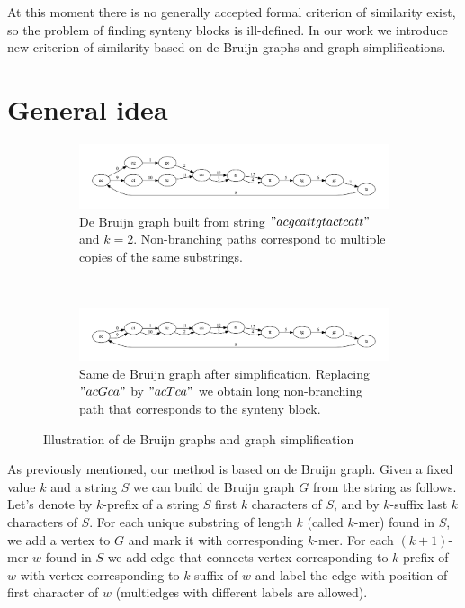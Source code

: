 \documentclass[a4paper,12pt]{scrartcl}
\begin{document}
At this moment there is no generally accepted formal criterion of similarity exist, so the problem of finding synteny blocks is ill-defined.
In our work we introduce new criterion of similarity based on de Bruijn graphs and graph simplifications.

\section{General idea}

\begin{figure}
        \begin{subfigure}[a]{1\textwidth}
		\includegraphics[scale = 0.50]{graph1.pdf}
		\small \caption{De Bruijn graph built from string \("acgcattgtactcatt"\) and \(k = 2\). Non-branching paths correspond to multiple
			copies of the same substrings.}
		\label{DeBruijnA}
        \end{subfigure}
	\\
        \begin{subfigure}[b]{1\textwidth}
		\includegraphics[scale = 0.50]{graph2.pdf}
		\small \caption{Same de Bruijn graph after simplification. Replacing \("acGca"\) by \("acTca"\) we obtain long non-branching path
			that corresponds to the synteny block.}
		\label{DeBruijnB}
        \end{subfigure}
	\small \caption{Illustration of de Bruijn graphs and graph simplification}
\end{figure}

As previously mentioned, our method is based on de Bruijn graph.
Given a fixed value \(k\) and a string \(S\) we can build de Bruijn graph \(G\) from the string as follows.
Let's denote by \(k\)-prefix of a string \(S\) first \(k\) characters of \(S\), and by \(k\)-suffix last \(k\) characters of \(S\).
For each unique substring of length \(k\) (called \(k\)-mer) found in \(S\), we add a vertex to \(G\) and mark it with
corresponding \(k\)-mer. For each \((k + 1)\)-mer \(w\) found in \(S\) we add edge that connects vertex corresponding to
\(k\) prefix of \(w\) with vertex corresponding to \(k\) suffix of \(w\) and label the edge with position of first character of \(w\)
(multiedges with different labels are allowed).
\end{document}
